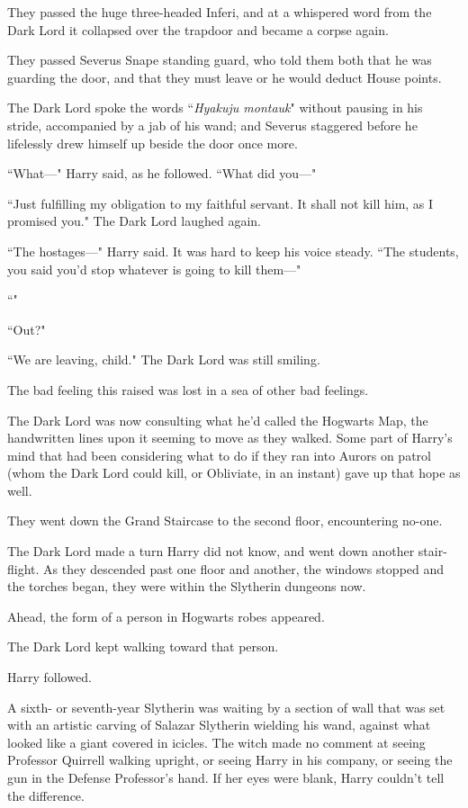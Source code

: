 They passed the huge three-headed Inferi, and at a whispered word from the Dark Lord it collapsed over the trapdoor and became a corpse again.

They passed Severus Snape standing guard, who told them both that he was guarding the door, and that they must leave or he would deduct House points.

The Dark Lord spoke the words ``\emph{Hyakuju montauk}" without pausing in his stride, accompanied by a jab of his wand; and Severus staggered before he lifelessly drew himself up beside the door once more.

``What—" Harry said, as he followed. ``What did you—"

``Just fulfilling my obligation to my faithful servant. It shall not kill him, as I promised you." The Dark Lord laughed again.

``The hostages—" Harry said. It was hard to keep his voice steady. ``The students, you said you'd stop whatever is going to kill them—"

``"

``Out?"

``We are leaving, child." The Dark Lord was still smiling.

The bad feeling this raised was lost in a sea of other bad feelings.

The Dark Lord was now consulting what he'd called the Hogwarts Map, the handwritten lines upon it seeming to move as they walked. Some part of Harry's mind that had been considering what to do if they ran into Aurors on patrol (whom the Dark Lord could kill, or Obliviate, in an instant) gave up that hope as well.

They went down the Grand Staircase to the second floor, encountering no-one.

The Dark Lord made a turn Harry did not know, and went down another stair-flight. As they descended past one floor and another, the windows stopped and the torches began, they were within the Slytherin dungeons now.

Ahead, the form of a person in Hogwarts robes appeared.

The Dark Lord kept walking toward that person.

Harry followed.

A sixth- or seventh-year Slytherin was waiting by a section of wall that was set with an artistic carving of Salazar Slytherin wielding his wand, against what looked like a giant covered in icicles. The witch made no comment at seeing Professor Quirrell walking upright, or seeing Harry in his company, or seeing the gun in the Defense Professor's hand. If her eyes were blank, Harry couldn't tell the difference.

